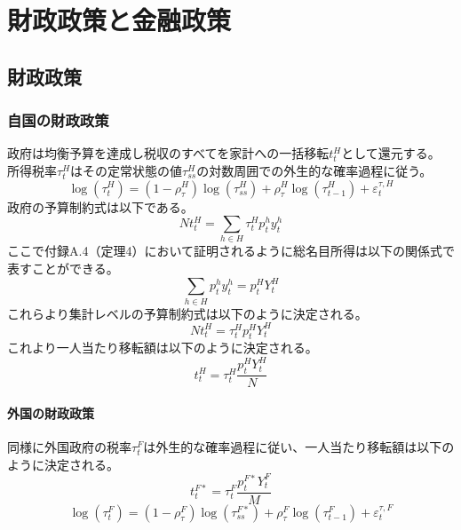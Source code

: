 
\section{財政政策と金融政策}
\label{sec:model_policies}

\subsection{財政政策}
\label{sec:model_policies_fiscal}

\subsubsection{自国の財政政策}
\label{sec:model_policies_fiscal_home}
政府は均衡予算を達成し税収のすべてを家計への一括移転\(t_t^H\)として還元する。
所得税率\(\tau_t^H\)はその定常状態の値\(\tau_{ss}^H\)の対数周囲での外生的な確率過程に従う。
\begin{equation}
\label{form:model_policies_fiscal_home_tau_eq}
    \log(\tau_t^H)=(1-\rho_{\tau}^H)\log(\tau_{ss}^H)+\rho_{\tau}^H\log(\tau_{t-1}^H)+\varepsilon_t^{\tau,H}
\end{equation}
政府の予算制約式は以下である。
\begin{equation}
\label{form:model_policies_fiscal_home_budget_eq}
    Nt_t^H=\sum_{h\in H}\tau_t^Hp_t^hy_t^h
\end{equation}
ここで付録A.4（定理4）において証明されるように総名目所得は以下の関係式で表すことができる。
\begin{equation}
\label{form:model_policies_nominal_income_identity}
    \sum_{h\in H}p_t^hy_t^h=p_t^HY_t^H
\end{equation}
これらより集計レベルの予算制約式は以下のように決定される。
\begin{equation}
\label{form:model_policies_gov_budget_aggregate}
    Nt_t^H=\tau_t^Hp_t^HY_t^H
\end{equation}
これより一人当たり移転額は以下のように決定される。
\begin{equation}
\label{form:model_policies_transfer_home}
    t_t^H=\tau_t^H\frac{p_t^HY_t^H}{N}
\end{equation}

\paragraph{外国の財政政策}
\label{sec:model_policies_fiscal_policy_foreign}
同様に外国政府の税率\(\tau_t^F\)は外生的な確率過程に従い、一人当たり移転額は以下のように決定される。
\begin{equation}
\label{form:model_policies_transfer_foreign}
    t_t^{F*}=\tau_t^F\frac{p_t^{F*}Y_t^F}{M}
\end{equation}
\begin{equation}
\label{form:model_policies_tax_rule_foreign}
    \log(\tau_t^F)=(1-\rho_{\tau}^F)\log(\tau_{ss}^{F*})+\rho_{\tau}^F\log(\tau_{t-1}^F)+\varepsilon_t^{\tau,F}
\end{equation}

